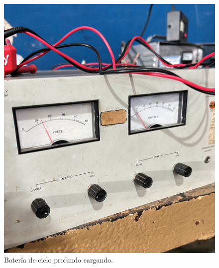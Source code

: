\begin{figure}[H]
    \centering
    \includegraphics[width=0.75\linewidth]{informes/4A4379B3-1BDC-4C4F-8C7A-3DA8EB3018AD.JPG}
    \caption{Batería de ciclo profundo cargando.}
\end{figure}
